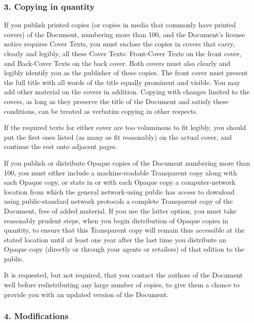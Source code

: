 \documentclass[a4paper,openany]{book}
\begin{document}
\begin{results}
\subsubsection*{3. Copying in quantity}

If you publish printed copies (or copies in media that commonly have
printed covers) of the Document, numbering more than 100, and the
Document's license notice requires Cover Texts, you must enclose the
copies in covers that carry, clearly and legibly, all these Cover
Texts: Front-Cover Texts on the front cover, and Back-Cover Texts on
the back cover.  Both covers must also clearly and legibly identify
you as the publisher of these copies.  The front cover must present
the full title with all words of the title equally prominent and
visible.  You may add other material on the covers in addition.
Copying with changes limited to the covers, as long as they preserve
the title of the Document and satisfy these conditions, can be treated
as verbatim copying in other respects.

If the required texts for either cover are too voluminous to fit
legibly, you should put the first ones listed (as many as fit
reasonably) on the actual cover, and continue the rest onto adjacent
pages.

If you publish or distribute Opaque copies of the Document numbering
more than 100, you must either include a machine-readable Transparent
copy along with each Opaque copy, or state in or with each Opaque copy
a computer-network location from which the general network-using
public has access to download using public-standard network protocols
a complete Transparent copy of the Document, free of added material.
If you use the latter option, you must take reasonably prudent steps,
when you begin distribution of Opaque copies in quantity, to ensure
that this Transparent copy will remain thus accessible at the stated
location until at least one year after the last time you distribute an
Opaque copy (directly or through your agents or retailers) of that
edition to the public.

It is requested, but not required, that you contact the authors of the
Document well before redistributing any large number of copies, to give
them a chance to provide you with an updated version of the Document.

\subsubsection*{4. Modifications}


\end{results}
\end{document}
